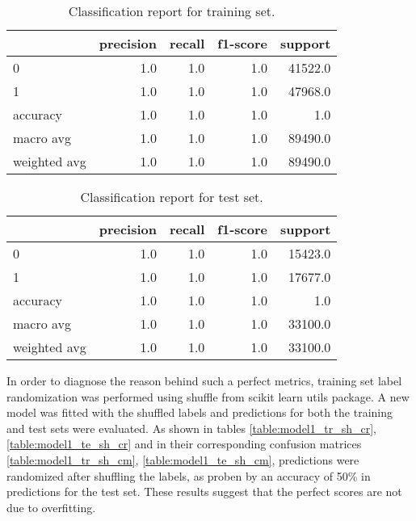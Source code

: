 \documentclass{article}
\begin{document}
\begin{itemize}
\begin{table}[h!]
\centering
\begin{tabular}{lrrrr}
\toprule
{} &  precision &  recall &  f1-score &  support \\
\midrule
0            &        1.0 &     1.0 &       1.0 &  41522.0 \\
1            &        1.0 &     1.0 &       1.0 &  47968.0 \\
accuracy     &        1.0 &     1.0 &       1.0 &      1.0 \\
macro avg    &        1.0 &     1.0 &       1.0 &  89490.0 \\
weighted avg &        1.0 &     1.0 &       1.0 &  89490.0 \\
\bottomrule
\end{tabular}
\caption{Classification report for training set.}
\label{table:model1_tr_cr}
\end{table}

\begin{table}[h!]
\centering
\begin{tabular}{lrrrr}
\toprule
{} &  precision &  recall &  f1-score &  support \\
\midrule
0            &        1.0 &     1.0 &       1.0 &  15423.0 \\
1            &        1.0 &     1.0 &       1.0 &  17677.0 \\
accuracy     &        1.0 &     1.0 &       1.0 &      1.0 \\
macro avg    &        1.0 &     1.0 &       1.0 &  33100.0 \\
weighted avg &        1.0 &     1.0 &       1.0 &  33100.0 \\
\bottomrule
\end{tabular}
\caption{Classification report for test set.}
\label{table:model1_te_cr}
\end{table}

In order to diagnose the reason behind such a perfect metrics, training set label randomization was performed using shuffle from scikit learn utils package. A new model was fitted with the shuffled labels and predictions for both the training and test sets were evaluated. As shown in tables \ref{table:model1_tr_sh_cr}, \ref{table:model1_te_sh_cr} and in their corresponding confusion matrices  \ref{table:model1_tr_sh_cm}, \ref{table:model1_te_sh_cm}, predictions were randomized after shuffling the labels, as proben by an accuracy of  50\% in predictions for the test set. These results suggest that the perfect scores are not due to overfitting.
 

\end{itemize}
\end{document}
